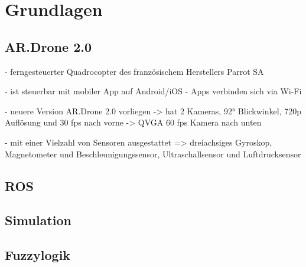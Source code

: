\chapter{Grundlagen}
\label{cha:Fundamentals}

\section{AR.Drone 2.0}

- ferngesteuerter Quadrocopter des französischem Herstellers Parrot SA %

- ist steuerbar mit mobiler App auf Android/iOS
- Apps verbinden sich via Wi-Fi

- neuere Version AR.Drone 2.0 vorliegen
-> hat 2 Kameras, 92° Blickwinkel, 720p Auflösung und 30 fps nach vorne
-> QVGA 60 fps Kamera nach unten

- mit einer Vielzahl von Sensoren ausgestattet => dreiachsiges Gyroskop, Magnetometer und Beschleunigungssensor, Ultraschallsensor und Luftdrucksensor

 


\section{ROS}


\section{Simulation}

\section{Fuzzylogik}


